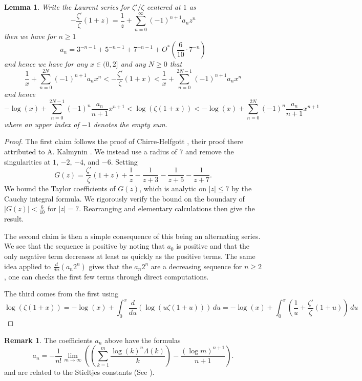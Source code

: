 \documentclass[10pt,english,letter, reqno]{amsart}
\newcommand{\Ostar}{O^{\ast}}
\theoremstyle{plain}
\newtheorem{lemma}[theorem]{Lemma}
\theoremstyle{definition}
\newtheorem{remark}[theorem]{Remark}
\begin{document}
\begin{lemma}\label{lemma:logderzetabound}
Write the Laurent series for $\zeta'/\zeta$ centered at $1$ as
\[ -\frac{\zeta'}{\zeta}(1+z) = \frac{1}{z} + \sum_{n=0}^{\infty}  (-1)^{n+1} a_n z^n \]
then we have for $n\geq 1$
\[ a_n = 3^{-n-1} +5^{-n-1} + 7^{-n-1}+ \Ostar\!\left(\frac{6}{10} \cdot 7^{-n}\right) \]
and hence we have for any $x\in (0,2]$ and any $N\geq 0$ that
\[  \frac{1}{x} +  \sum_{n=0}^{2N}  (-1)^{n+1} a_n x^n < -\frac{\zeta'}{\zeta}(1+x) <  \frac{1}{x} +  \sum_{n=0}^{2N-1}  (-1)^{n+1} a_n x^n \]
and hence
\[ -\log(x) +  \sum_{n=0}^{2N-1}  (-1)^n \frac{a_n}{n+1} x^{n+1} < \log(\zeta(1+x)) < -\log(x)  +  \sum_{n=0}^{2N} (-1)^n \frac{a_n}{n+1} x^{n+1} \]
where an upper index of $-1$ denotes the empty sum.
\end{lemma}
\begin{proof}
The first claim follows the proof of Chirre-Helfgott \cite[Lemma~A.7]{ChirreHelfgott2025}, their proof there attributed to
A. Kalmynin \cite{Kalmynin2025}. We instead use a radius of $7$ and remove the singularities at $1$, $-2$, $-4$, and $-6$.
Setting \[ G(z) = \frac{\zeta'}{\zeta}(1+z) + \frac{1}{z} - \frac{1}{z+3} - \frac{1}{z+5} - \frac{1}{z+7}. \]
We bound the Taylor coefficients of $G(z)$, which is analytic on $|z|\leq 7$ by the Cauchy integral formula.
We rigorously verify the bound on the boundary of $|G(z)| < \frac{6}{10}$ for $|z|=7$. Rearranging and elementary calculations then give the result.

The second claim is then a simple consequence of this being an alternating series.
We see that the sequence is positive by noting that $a_0$ is positive and that the only negative term decreases at least as quickly as the positive terms.
The same idea applied to $\frac{d}{dn} (a_n2^n)$ gives that the $a_n2^n$ are a decreasing sequence for $n\geq 2$, one can checks the first few terms through direct computations.

The third comes from the first using
\[ \log(\zeta(1+x)) = -\log(x) + \int_0^{x} \frac{d}{du}(\log(u\zeta(1+u)))\,du  =   -\log(x) + \int_0^{x} \left(\frac{1}{u} + \frac{\zeta'}{\zeta}(1+u)\right)\,du\]
\end{proof}
\begin{remark}\label{lemma:logderzetabound-remark}
The coefficients $a_n$ above have the formulas
\[ a_n =  -\frac{1}{n!}\lim_{m\rightarrow \infty} \left( \left( \sum_{k=1}^{m}  \frac{\log(k)^n\Lambda(k)}{k} \right) - \frac{(\log m)^{n+1}}{n+1}\right) .\]
and are related to the Stieltjes constants (See \cite{Coffey2009}).
\end{remark}
\end{document}
